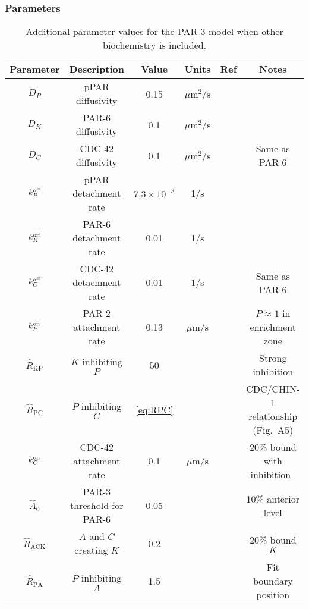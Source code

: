 \documentclass[11pt]{article}
\newcommand{\6}[1]{#1_{\text{6}}}
\newcommand{\3}[1]{#1_{\text{3}}}
\begin{document}
\subsubsection{Parameters \label{sec:param23}}
\begin{table}
\begin{small}
\centering
\begin{tabular}{|c|c|c|c|c|c|}\hline
Parameter & Description & Value & Units & Ref & Notes \\ \hline
$D_P$ & pPAR diffusivity & 0.15 & $\mu$m$^2$/s & \cite{goehring2011polarization}&  \\ 
$D_K$ & PAR-6 diffusivity & 0.1 & $\mu$m$^2$/s & \cite{robin2014single}&  \\ 
$D_C$ & CDC-42 diffusivity & 0.1 & $\mu$m$^2$/s && Same as PAR-6 \\ 
$k^\text{off}_P$ & pPAR detachment rate & $7.3 \times 10^{-3}$ & 1/s & \cite{goehring2011polarization}&  \\  
$k^\text{off}_K$ & PAR-6 detachment rate & 0.01 & 1/s & \cite{robin2014single}&  \\  
$k^\text{off}_C$ & CDC-42 detachment rate & 0.01 & 1/s & &  Same as PAR-6\\  \hline
$k^\text{on}_P$ & PAR-2 attachment rate & 0.13 & $\mu$m/s & \cite{gross2019guiding} & $P \approx 1$ in enrichment zone\\
$\hat{R}_\text{KP}$ & $K$ inhibiting $P$ &50  &  &  & Strong inhibition\\
$\hat R_\text{PC}$ & $P$ inhibiting $C$ & \eqref{eq:RPC}  & & \cite{sailer2015dynamic} & CDC/CHIN-1 relationship (Fig.\ A5)\\ 
$k^\text{on}_C$ & CDC-42 attachment rate & 0.1 & $\mu$m/s & & 20\% bound with inhibition\ \\ 
$\hat A_0$ & PAR-3 threshold for PAR-6 & 0.05&  & \cite{sailer2015dynamic}& 10\% anterior level \\
$\hat{R}_\text{ACK}$ & $A$ and $C$ creating $K$ & 0.2  &  &  & 20\% bound $K$\\
$\hat{R}_\text{PA}$ & $P$ inhibiting $A$ & 1.5  &  &  & Fit boundary position\\ \hline
\end{tabular}
\caption{\label{tab:paramsBC}Additional parameter values for the PAR-3 model when other biochemistry is included.}
\end{small}
\end{table}
\end{document}
